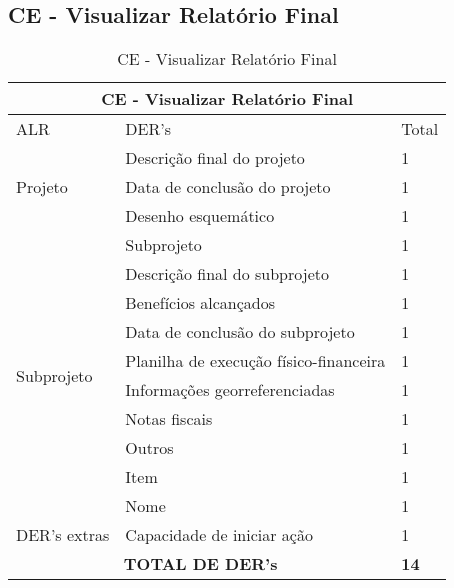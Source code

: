 \pagebreak
  \subsection{CE - Visualizar Relatório Final}
 \begin{table}[!h]
 \centering
  \caption{CE - Visualizar Relatório Final}
\label{ee_visualizar_relatorio_final}
\begin{tabular}{|l|l|l|}
\hline
\multicolumn{3}{|c|}{CE - Visualizar Relatório Final}                                                                 \\ \hline
ALR                           & DER's                                                & Total              \\ \hline
\multirow{3}{*}{Projeto}     & Descrição final do projeto             & 1 \\ \cline{2-3}
                             & Data de conclusão do projeto           & 1 \\ \cline{2-3}
                             & Desenho esquemático                    & 1 \\ \cline{2-3} \hline
\multirow{10}{*}{Subprojeto} & Subprojeto                             & 1 \\ \cline{2-3}
                             & Descrição final do subprojeto          & 1 \\ \cline{2-3}
                             & Benefícios alcançados                  & 1 \\ \cline{2-3}
                             & Data de conclusão do subprojeto        & 1 \\ \cline{2-3}
                             & Planilha de execução físico-financeira & 1 \\ \cline{2-3}
                             & Informações georreferenciadas          & 1 \\ \cline{2-3}
                             & Notas fiscais                          & 1 \\ \cline{2-3}
                             & Outros                                 & 1 \\ \cline{2-3}
                             & Item                                   & 1 \\ \cline{2-3}
                             & Nome                                   & 1 \\ \hline
DER's extras & Capacidade de iniciar ação             & 1 \\ \hline
\multicolumn{2}{|c|}{\textbf{TOTAL DE DER's}}                                                 & \textbf{14}                 \\ \hline
\end{tabular}
\end{table}

